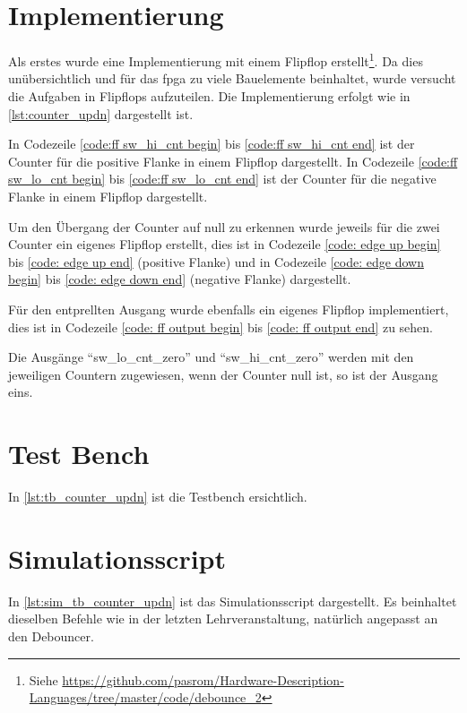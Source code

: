 \documentclass[./\jobname.tex]{subfiles}
\begin{document}
\section{Implementierung}
%
Als erstes wurde eine Implementierung mit einem Flipflop erstellt\footnote{Siehe \url{https://github.com/pasrom/Hardware-Description-Languages/tree/master/code/debounce_2}}. Da dies unübersichtlich und für das \gls{fpga} zu viele Bauelemente beinhaltet, wurde versucht die Aufgaben in Flipflops aufzuteilen. Die Implementierung erfolgt wie in \autoref{lst:counter_updn} dargestellt ist.\par
%
In Codezeile \autoref{code:ff sw_hi_cnt begin} bis \autoref{code:ff sw_hi_cnt end} ist der Counter für die positive Flanke in einem Flipflop dargestellt. In Codezeile \autoref{code:ff sw_lo_cnt begin} bis \autoref{code:ff sw_lo_cnt end} ist der Counter für die negative Flanke in einem Flipflop dargestellt.\par
%
Um den Übergang der Counter auf null zu erkennen wurde jeweils für die zwei Counter ein eigenes Flipflop erstellt, dies ist in Codezeile \autoref{code: edge up begin} bis \autoref{code: edge up end} (positive Flanke) und in Codezeile \autoref{code: edge down begin} bis \autoref{code: edge down end} (negative Flanke) dargestellt.\par
%
Für den entprellten Ausgang wurde ebenfalls ein eigenes Flipflop implementiert, dies ist in Codezeile \autoref{code: ff output begin} bis \autoref{code: ff output end} zu sehen.\par
%
Die Ausgänge \enquote{sw\_lo\_cnt\_zero} und \enquote{sw\_hi\_cnt\_zero} werden mit den jeweiligen Countern zugewiesen, wenn der Counter null ist, so ist der Ausgang eins.
%

%
\section{Test Bench}
%
In \autoref{lst:tb_counter_updn} ist die Testbench ersichtlich.
%

%
\section{Simulationsscript}
%
In \autoref{lst:sim_tb_counter_updn} ist das Simulationsscript dargestellt. Es beinhaltet dieselben Befehle wie in der letzten Lehrveranstaltung, natürlich angepasst an den Debouncer.
%

%
\end{document}
